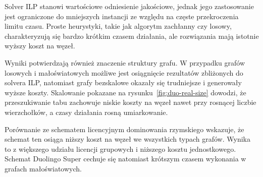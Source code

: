 Solver ILP stanowi wartościowe odniesienie jakościowe, jednak jego zastosowanie jest ograniczone do mniejszych instancji ze względu na częste przekroczenia limitu czasu. Proste heurystyki, takie jak algorytm zachłanny czy losowy, charakteryzują się bardzo krótkim czasem działania, ale rozwiązania mają istotnie wyższy koszt na węzeł.

Wyniki potwierdzają również znaczenie struktury grafu. W przypadku grafów losowych i małoświatowych możliwe jest osiągnięcie rezultatów zbliżonych do solvera ILP, natomiast grafy bezskalowe okazały się trudniejsze i generowały wyższe koszty. Skalowanie pokazane na rysunku~\ref{fig:duo-real-size} dowodzi, że przeszukiwanie tabu zachowuje niskie koszty na węzeł nawet przy rosnącej liczbie wierzchołków, a czasy działania rosną umiarkowanie.

Porównanie ze schematem licencyjnym dominowania rzymskiego wskazuje, że schemat ten osiąga niższy koszt na węzeł we wszystkich typach grafów. Wynika to z większego udziału licencji grupowych i niższego kosztu jednostkowego. Schemat Duolingo Super cechuje się natomiast krótszym czasem wykonania w grafach małoświatowych.
